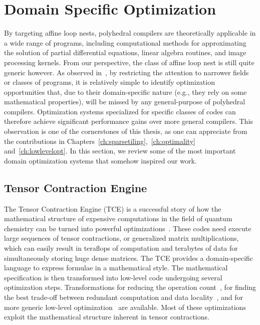 \section{Domain Specific Optimization}
\label{sec:bkg:dslopt}
By targeting affine loop nests, polyhedral compilers are theoretically applicable in a wide range of programs, including computational methods for approximating the solution of partial differential equations, linear algebra routines, and image processing kernels. From our perspective, the class of affine loop nest is still quite generic however. As observed in~\cite{armin-poly-usability}, by restricting the attention to narrower fields or classes of programs, it is relatively simple to identify optimization opportunities that, due to their domain-specific nature (e.g., they rely on some mathematical properties), will be missed by any general-purpose of polyhedral compilers. Optimization systems specialized for specific classes of codes can therefore achieve significant performance gains over more general compilers. This observation is one of the cornerstones of this thesis, as one can appreciate from the contributions in Chapters~\ref{ch:sparsetiling},~\ref{ch:optimality} and~\ref{ch:lowlevelopt}. In this section, we review some of the most important domain optimization systems that somehow inspired our work. 

\subsection{Tensor Contraction Engine}
The Tensor Contraction Engine (TCE) is a successful story of how the mathematical structure of expensive computations in the field of quantum chemistry can be turned into powerful optimizations~\cite{TCE-url}. These codes need execute large sequences of tensor contractions, or generalized matrix multiplications, which can easily result in teraflops of computation and terabytes of data for simultaneously storing huge dense matrices. The TCE provides a domain-specific language to express formulae in a mathematical style. The mathematical specification is then transformed into low-level code undergoing several optimization steps. Transformations for reducing the operation count~\cite{TCE-2006,TCE-2009}, for finding the best trade-off between redundant computation and data locality~\cite{TCE-2011}, and for more generic low-level optimization~\cite{TCE-2012} are available. Most of these optimizations exploit the mathematical structure inherent in tensor contractions. 

